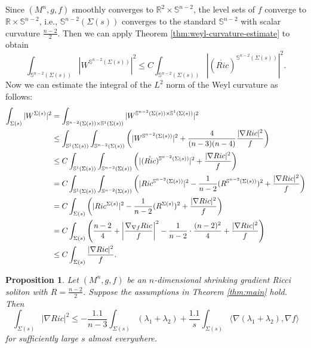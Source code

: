 \documentclass[a4, 12pt]{amsart}
\theoremstyle{plain}
\newtheorem{prop}[theo]{Proposition}
\begin{document}
Since $(M^n, g, f)$ smoothly converges to $\mathbb{R}^2 \times \mathbb{S}^{n-2}$, the level sets of $f$ converge to $\mathbb{R} \times \mathbb{S}^{n-2}$, i.e., $\mathbb{S}^{n-2}(\Sigma(s))$ converges to the standard $\mathbb{S}^{n-2}$ with scalar curvature $\frac{n-2}{2}$. Then we can apply Theorem \ref{thm:weyl-curvature-estimate} to obtain
\begin{equation*}\label{eq:weyl-sphere-estimate}
	\int_{\mathbb{S}^{n-2}(\Sigma(s))}|W^{\mathbb{S}^{n-2}(\Sigma(s))}|^2 \leq C\int_{\mathbb{S}^{n-2}(\Sigma(s))}|(\mathring{Ric})^{\mathbb{S}^{n-2}(\Sigma(s))}|^2.
\end{equation*}
Now we can estimate the integral of the $L^2$ norm of the Weyl curvature as follows:
\begin{equation}\label{eq:weyl-integral-estimate}
	\begin{aligned}
	\int_{\Sigma(s)}|W^{\Sigma(s)}|^2 &= \int_{\mathbb{S}^{n-2}(\Sigma(s)) \times \mathbb{S}^1(\Sigma(s))}|W^{\mathbb{S}^{n-2}(\Sigma(s)) \times \mathbb{S}^1(\Sigma(s))}|^2 \notag \\
	&\leq \int_{\mathbb{S}^1(\Sigma(s))}\int_{\mathbb{S}^{n-2}(\Sigma(s))}\left(|W^{\mathbb{S}^{n-2}(\Sigma(s))}|^2 + \frac{4}{(n-3)(n-4)}\frac{|\nabla Ric|^2}{f}\right) \notag \\
	&\leq C\int_{\mathbb{S}^1(\Sigma(s))}\int_{\mathbb{S}^{n-2}(\Sigma(s))}\left(|(\mathring{Ric})^{\mathbb{S}^{n-2}(\Sigma(s))}|^2 + \frac{|\nabla Ric|^2}{f}\right) \notag \\
	&= C\int_{\mathbb{S}^1(\Sigma(s))}\int_{\mathbb{S}^{n-2}(\Sigma(s))} \left(|Ric^{\mathbb{S}^{n-2}(\Sigma(s))}|^2 - \frac{1}{n-2}(R^{\mathbb{S}^{n-2}(\Sigma(s))})^2 + \frac{|\nabla Ric|^2}{f}\right) \notag \\
	&= C \int_{\Sigma(s)}\left(|Ric^{\Sigma(s)}|^2 - \frac{1}{n-2}(R^{\Sigma(s)})^2 + \frac{|\nabla Ric|^2}{f}\right) \notag \\
	&= C\int_{\Sigma(s)} \left(\frac{n-2}{4} + \left|\frac{\nabla_{\nabla f}Ric}{f}\right|^2 - \frac{1}{n-2} \cdot \frac{(n-2)^2}{4} + \frac{|\nabla Ric|^2}{f}\right) \notag \\
	&\leq C\int_{\Sigma(s)} \frac{|\nabla Ric|^2}{f}.
\end{aligned}
\end{equation}
\begin{prop}\label{prop:ricci-gradient-estimate}
	Let $(M^n, g, f)$ be an $n$-dimensional shrinking gradient Ricci soliton with $R = \frac{n-2}{2}$. Suppose the assumptions in Theorem \ref{thm:main} hold. Then
	\begin{equation*}\label{eq:ricci-gradient-integral}
		\int_{\Sigma(s)}|\nabla Ric|^2 \leq -\frac{1.1}{n-3}\int_{\Sigma(s)}(\lambda_1+\lambda_2) + \frac{1.1}{s}\int_{\Sigma(s)}\langle\nabla (\lambda_1+\lambda_2), \nabla f \rangle
	\end{equation*}
	for sufficiently large $s$ almost everywhere.
\end{prop}
\end{document}

